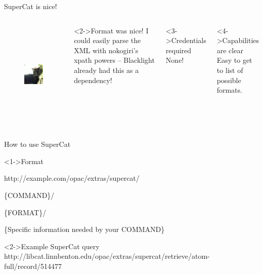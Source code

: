 \documentclass{beamer}
\begin{document}
\begin{frame}{SuperCat is nice!}

\begin{columns}

 \begin{figure}
  \begin{center}
   \includegraphics[height=2in]{supercat.jpg}
  \end{center}

 \end{figure}


\begin{block}<2->{Format was nice!}
I could easily parse the XML with nokogiri's xpath powers -- Blacklight already had this as a dependency!
\end{block}
\begin{block}<3->{Credentials required}
None!
\end{block}
\begin{block}<4->{Capabilities are clear}
Easy to get to list of possible formats. 
\end{block}
\end{columns}
 
\end{frame}

\begin{frame}{How to use SuperCat}

\begin{block}<1->{Format}

http://example.com/opac/extras/supercat/

\{COMMAND\}/

\{FORMAT\}/

\{Specific information needed by your COMMAND\}

\end{block}
\begin{block}<2->{Example SuperCat query}
 http://libcat.linnbenton.edu/opac/extras/supercat/retrieve/atom-full/record/514477
 
\end{block}
\end{frame}
\end{document}
